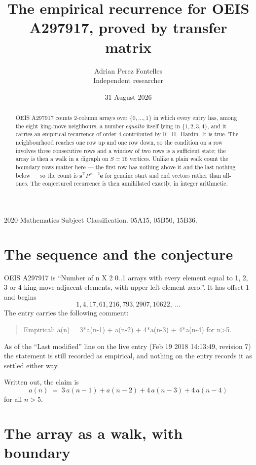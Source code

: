 \documentclass[11pt,a4paper]{article}
\title{The empirical recurrence for OEIS A297917, proved by transfer matrix}
\author{Adrian Perez Fontelles\\ \small Independent researcher}
\date{31 August 2026}
\theoremstyle{plain}
\theoremstyle{definition}
\begin{document}
\maketitle

\begin{abstract}
OEIS A297917 counts $2$-column arrays over $\{0,\dots,1\}$ in which every entry has,
among the eight king-move neighbours, a number $equal to$ itself lying in $\{1,2,3,4\}$, and it carries an empirical
recurrence of order $4$ contributed by R.~H.~Hardin. It is true. The neighbourhood
reaches one row up and one row down, so the condition on a row involves three consecutive
rows and a window of two rows is a sufficient state; the array is then a walk in a digraph
on $S=16$ vertices. Unlike a plain walk count the boundary rows matter here --- the first
row has nothing above it and the last nothing below --- so the count is
$\mathbf{s}^{\!\top}P^{\,n-2}\mathbf{e}$ for genuine start and end vectors rather than
all-ones. The conjectured recurrence is then annihilated exactly, in integer arithmetic.
\end{abstract}

\noindent\small 2020 Mathematics Subject Classification. 05A15, 05B50, 15B36.\normalsize

\section{The sequence and the conjecture}

OEIS A297917 is ``Number of n X 2 0..1 arrays with every element equal to 1, 2, 3 or 4 king-move adjacent elements, with upper left element zero.''. It has offset
$1$ and begins
\[
1, 4, 17, 61, 216, 793, 2907, 10622,\ \dots
\]
The entry carries the following comment:
\begin{quote}\small
Empirical: a(n) = 3*a(n-1) + a(n-2) + 4*a(n-3) + 4*a(n-4) for n>5.
\end{quote}
As of the ``Last modified'' line on the live entry (Feb 19 2018 14:13:49, revision
7) the statement is still recorded as empirical, and nothing on the entry
records it as settled either way.

Written out, the claim is
\begin{equation}\label{eq:conj}
a(n)\;=\;3\,a(n-1) + a(n-2) + 4\,a(n-3) + 4\,a(n-4)
\end{equation}
for all $n>5$.

\section{The array as a walk, with boundary}
\end{document}
